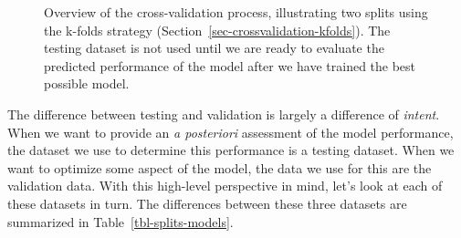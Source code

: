 \documentclass[
  letterpaper,
]{scrbook}
\begin{document}
\begin{figure}[pbt]


\caption{\label{fig-crossvalidation-overview}Overview of the
cross-validation process, illustrating two splits using the k-folds
strategy (Section~\ref{sec-crossvalidation-kfolds}). The testing dataset
is not used until we are ready to evaluate the predicted performance of
the model after we have trained the best possible model.}

\end{figure}%

The difference between testing and validation is largely a difference of
\emph{intent}. When we want to provide an \emph{a posteriori} assessment
of the model performance, the dataset we use to determine this
performance is a testing dataset. When we want to optimize some aspect
of the model, the data we use for this are the validation data. With
this high-level perspective in mind, let's look at each of these
datasets in turn. The differences between these three datasets are
summarized in Table~\ref{tbl-splits-models}.
\end{document}
